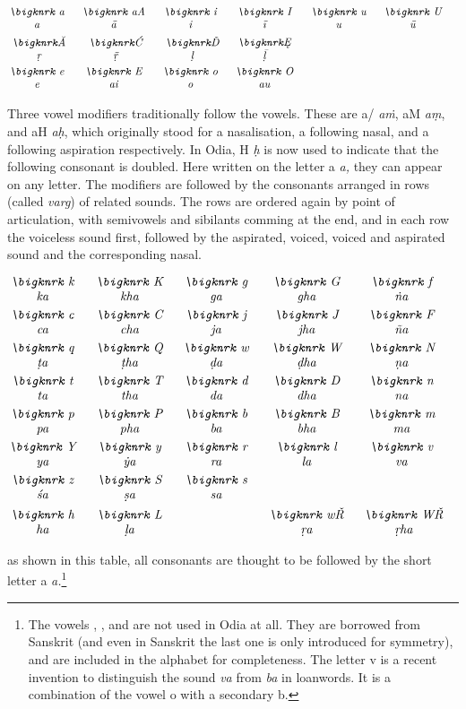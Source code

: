 \documentclass[12pt]{article}
\begin{document}
\def\OB#1#2{$\hbox{\bigknrk#1}\atop\hbox{\strut\it#2}$}

$$
\vbox{\halign{\it\hfill#\hfill\quad&&\it\hfill#\hfill\quad\cr
\OB{a}{a}	&\OB{aA}{\=a}	&\OB{i}{i}	&\OB{I}{\=\i}	&\OB{u}{u}	&\OB{U}{\=u}	\cr\noalign{\smallskip}
\OB{\odvowelri}{\d r}&\OB{\odvowelrii}{\d{\=r}}&\OB{\odvowelli}{\d l}&\OB{\odvowellii}{\d{\=l}}	\cr\noalign{\smallskip}
\OB{e}{e}	&\OB{E}{ai}	&\OB{o}{o}	&\OB{O}{au}	\cr
}}
$$

\noindent Three vowel modifiers traditionally follow the vowels. These are
{\knrk a/} {\it a\.m}, {\knrk aM} {\it a\d{m}}, and {\knrk aH} {\it a\d{h}},
which originally stood for a nasalisation, a following
nasal, and a following aspiration respectively. 
In Odia, {\knrk H} {\it \d h} is now used to indicate that the following consonant
is doubled.
Here written on the letter {\knrk a} {\it a,}
they can appear on any letter. The modifiers are 
followed by the consonants arranged in rows (called {\it varg}) of related sounds. The rows are ordered
again by point of articulation, with semivowels and sibilants comming at the end, 
and in each row the voiceless sound first, followed by the aspirated, voiced,
voiced and aspirated sound and the corresponding nasal.

$$
\vbox{\halign{\it\hfill#\hfill\quad&&\it\hfill#\hfill\quad\cr
\OB{k}{ka}	&\OB{K}{kha}	&\OB{g}{ga}	&\OB{G}{gha}	&\OB{f}{\.na}	\cr\noalign{\smallskip}
\OB{c}{ca}	&\OB{C}{cha}	&\OB{j}{ja}	&\OB{J}{jha}	&\OB{F}{\~na}	\cr\noalign{\smallskip}
\OB{q}{\d ta}	&\OB{Q}{\d tha}	&\OB{w}{\d da}	&\OB{W}{\d dha}	&\OB{N}{\d na}	\cr\noalign{\smallskip}
\OB{t}{ta}	&\OB{T}{tha}	&\OB{d}{da}	&\OB{D}{dha}	&\OB{n}{na}	\cr\noalign{\smallskip}
\OB{p}{pa}	&\OB{P}{pha}	&\OB{b}{ba}	&\OB{B}{bha}	&\OB{m}{ma}	\cr\noalign{\smallskip}
\OB{Y}{ya}	&\OB{y}{\.ya}	&\OB{r}{ra}	&\OB{l}{la}	&\OB{v}{va}	\cr\noalign{\smallskip}
\OB{z}{\'sa}	&\OB{S}{\d sa}	&\OB{s}{sa}					\cr\noalign{\smallskip}
\OB{h}{ha}	&\OB{L}{\d la}	&	&\OB{w\odnukta}{\d{r}a}	&\OB{W\odnukta}{\d{r}ha}\cr
}}
$$

\noindent as shown in this table, all consonants are thought to be followed by the
short letter {\knrk a} {\it a.}\footnote{The vowels {\knrk\odvowelrii, \odvowelli,}
and {\knrk\odvowellii} are not used in Odia at all. They are borrowed from Sanskrit
(and even in Sanskrit the last one is only introduced for symmetry), and are
included in the alphabet for completeness. The letter {\knrk v} is a
recent invention to distinguish the sound {\it va} from {\it ba} in loanwords.
It is a combination of the vowel {\knrk o} with a secondary {\knrk b}.}
\end{document}
